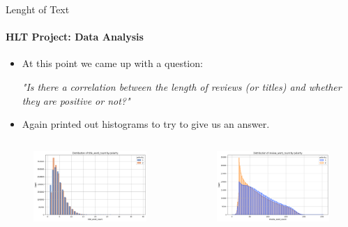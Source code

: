 \documentclass{beamer}
\theoremstyle{definition}
\theoremstyle{plain}
\begin{document}
\begin{frame}{Lenght of Text}
\framesubtitle{HLT Project: Data Analysis}
{\small 

\begin{itemize}
    \item At this point we came up with a question:
    \begin{center}
        {\footnotesize \textit{"Is there a correlation between the length of reviews (or titles) and whether they are positive or not?"}}
    \end{center}
    \item Again printed out histograms to try to give us an answer.
\end{itemize}

\begin{columns}
    \begin{figure}
        \centering
        \includegraphics[scale=0.23]{Figures/distribution1.5.png}
    \end{figure}

    \begin{figure}
        \centering
        \includegraphics[scale=0.23]{Figures/distribution1.6.png}
    \end{figure}
\end{columns}

}
\end{frame}
\end{document}
